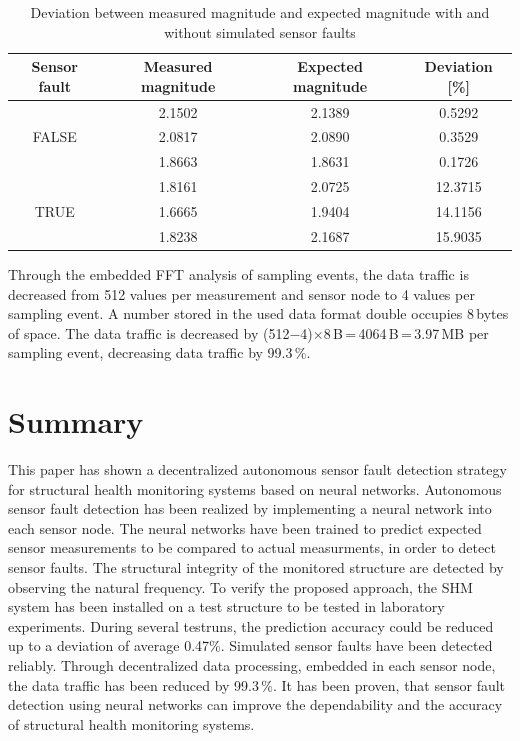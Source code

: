 \documentclass[12pt,a4paper]{scrartcl}
\begin{document}
\begin{table}[hb]
	\centering
	\caption{Deviation between measured magnitude and expected magnitude with and without simulated sensor faults}
	\begin{tabular}{c c c c}
		\toprule
		Sensor fault & Measured magnitude & Expected magnitude & Deviation [\%]\\ 
		\midrule
		  & 2.1502 & 2.1389 & 0.5292 \\
		FALSE & 2.0817 & 2.0890 & 0.3529 \\
		  & 1.8663 & 1.8631 & 0.1726 \\
		\midrule	
		 & 1.8161 & 2.0725 & 12.3715\\
		TRUE & 1.6665 & 1.9404 & 14.1156\\
		 & 1.8238 & 2.1687 & 15.9035\\
		\bottomrule
	\end{tabular}
	\label{tab:sensorfault}
\end{table}

Through the embedded FFT analysis of sampling events, the data traffic is decreased from 512 values per measurement and sensor node to 4 values per sampling event.
A number stored in the used data format double occupies 8\,bytes of space.
The data traffic is decreased by (512$-$4)$\times$8\,B\,=\,4064\,B\,=\,3.97\,MB per sampling event, decreasing data traffic by 99.3\,\%.


\section*{Summary}

This paper has shown a decentralized autonomous sensor fault detection strategy for structural health monitoring systems based on neural networks. 
Autonomous sensor fault detection has been realized by implementing a neural network into each sensor node.
The neural networks have been trained to predict expected sensor measurements to be compared to actual measurments, in order to detect sensor faults.
The structural integrity of the monitored structure are detected by observing the natural frequency.
To verify the proposed approach, the SHM system has been installed on a test structure to be tested in laboratory experiments.
During several testruns, the prediction accuracy could be reduced up to a deviation of average 0.47\%.
Simulated sensor faults have been detected reliably.
Through decentralized data processing, embedded in each sensor node, the data traffic has been reduced by 99.3\,\%.
It has been proven, that sensor fault detection using neural networks can improve the dependability and the accuracy of structural health monitoring systems.





\end{document}

